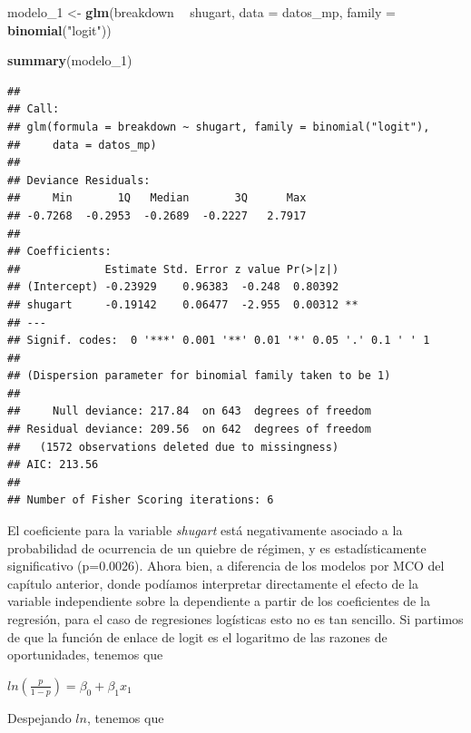 \documentclass[]{book}
\newenvironment{Shaded}{\begin{snugshade}}{\end{snugshade}}
\newcommand{\KeywordTok}[1]{\textcolor[rgb]{0.13,0.29,0.53}{\textbf{#1}}}
\newcommand{\DataTypeTok}[1]{\textcolor[rgb]{0.13,0.29,0.53}{#1}}
\newcommand{\DecValTok}[1]{\textcolor[rgb]{0.00,0.00,0.81}{#1}}
\newcommand{\StringTok}[1]{\textcolor[rgb]{0.31,0.60,0.02}{#1}}
\newcommand{\OperatorTok}[1]{\textcolor[rgb]{0.81,0.36,0.00}{\textbf{#1}}}
\newcommand{\NormalTok}[1]{#1}
\begin{document}
\begin{Shaded}
\begin{Highlighting}[]
\NormalTok{modelo_}\DecValTok{1}\NormalTok{ <-}\StringTok{ }\KeywordTok{glm}\NormalTok{(breakdown }\OperatorTok{~}\StringTok{ }\NormalTok{shugart, }
                \DataTypeTok{data   =}\NormalTok{ datos_mp,}
                \DataTypeTok{family =} \KeywordTok{binomial}\NormalTok{(}\StringTok{"logit"}\NormalTok{))}
\end{Highlighting}
\end{Shaded}

\begin{Shaded}
\begin{Highlighting}[]
\KeywordTok{summary}\NormalTok{(modelo_}\DecValTok{1}\NormalTok{)}
\end{Highlighting}
\end{Shaded}

\begin{verbatim}
## 
## Call:
## glm(formula = breakdown ~ shugart, family = binomial("logit"), 
##     data = datos_mp)
## 
## Deviance Residuals: 
##     Min       1Q   Median       3Q      Max  
## -0.7268  -0.2953  -0.2689  -0.2227   2.7917  
## 
## Coefficients:
##             Estimate Std. Error z value Pr(>|z|)   
## (Intercept) -0.23929    0.96383  -0.248  0.80392   
## shugart     -0.19142    0.06477  -2.955  0.00312 **
## ---
## Signif. codes:  0 '***' 0.001 '**' 0.01 '*' 0.05 '.' 0.1 ' ' 1
## 
## (Dispersion parameter for binomial family taken to be 1)
## 
##     Null deviance: 217.84  on 643  degrees of freedom
## Residual deviance: 209.56  on 642  degrees of freedom
##   (1572 observations deleted due to missingness)
## AIC: 213.56
## 
## Number of Fisher Scoring iterations: 6
\end{verbatim}

El coeficiente para la variable \emph{shugart} está negativamente
asociado a la probabilidad de ocurrencia de un quiebre de régimen, y es
estadísticamente significativo (p=0.0026). Ahora bien, a diferencia de
los modelos por MCO del capítulo anterior, donde podíamos interpretar
directamente el efecto de la variable independiente sobre la dependiente
a partir de los coeficientes de la regresión, para el caso de
regresiones logísticas esto no es tan sencillo. Si partimos de que la
función de enlace de logit es el logaritmo de las razones de
oportunidades, tenemos que

\(ln(\frac {p}{1 - p}) = \beta_{0} + \beta_{1}x_{1}\)

Despejando \(ln\), tenemos que
\end{document}
